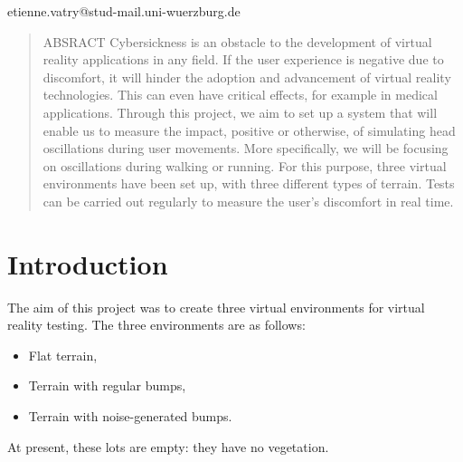 \documentclass[american]{acmtog} %
\begin{document}

\maketitle

\begin{bottomstuff}
etienne.vatry@stud-mail.uni-wuerzburg.de
\end{bottomstuff}

\begin{abstract}
ABSRACT Cybersickness is an obstacle to the development of virtual reality applications in any field. If the user experience is negative due to discomfort, it will hinder the adoption and advancement of virtual reality technologies. This can even have critical effects, for example in medical applications. Through this project, we aim to set up a system that will enable us to measure the impact, positive or otherwise, of simulating head oscillations during user movements. More specifically, we will be focusing on oscillations during walking or running. For this purpose, three virtual environments have been set up, with three different types of terrain. Tests can be carried out regularly to measure the user's discomfort in real time.
\end{abstract}


\section{Introduction}
\label{sec:introduction}
The aim of this project was to create three virtual environments for virtual reality testing. The three environments are as follows:
\begin{itemize}[label=\textbullet]
    \item Flat terrain,
    \item Terrain with regular bumps,
    \item Terrain with noise-generated bumps.
\end{itemize}
At present, these lots are empty: they have no vegetation.
\end{document}
